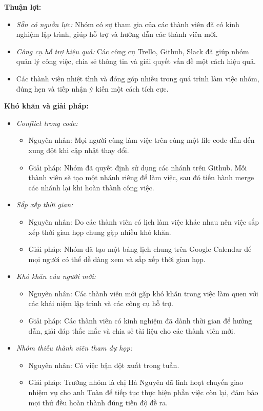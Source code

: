 \documentclass[a4paper,12pt]{article}
\begin{document}
\textbf{Thuận lợi:}
\begin{itemize}
    \item \textit{Sẵn có nguồn lực:} Nhóm có sự tham gia của các thành viên đã có kinh nghiệm lập trình, giúp hỗ trợ và hướng dẫn các thành viên mới.
    \item \textit{Công cụ hỗ trợ hiệu quả:} Các công cụ Trello, Github, Slack đã giúp nhóm quản lý công việc, chia sẻ thông tin và giải quyết vấn đề một cách hiệu quả.
    \item Các thành viên nhiệt tình và đóng góp nhiều trong quá trình làm việc nhóm, đúng hẹn và tiếp nhận ý kiến một cách tích cực.
\end{itemize}

\textbf{Khó khăn và giải pháp:}
\begin{itemize}
    \item \textit{Conflict trong code:}
    \begin{itemize}
        \item Nguyên nhân: Mọi người cùng làm việc trên cùng một file code dẫn đến xung đột khi cập nhật thay đổi.
        \item Giải pháp: Nhóm đã quyết định sử dụng các nhánh trên Github. Mỗi thành viên sẽ tạo một nhánh riêng để làm việc, sau đó tiến hành merge các nhánh lại khi hoàn thành công việc.
    \end{itemize}

    \item \textit{Sắp xếp thời gian:}
    \begin{itemize}
        \item Nguyên nhân: Do các thành viên có lịch làm việc khác nhau nên việc sắp xếp thời gian họp chung gặp nhiều khó khăn.
        \item Giải pháp: Nhóm đã tạo một bảng lịch chung trên Google Calendar để mọi người có thể dễ dàng xem và sắp xếp thời gian họp.
    \end{itemize}

    \item \textit{Khó khăn của người mới:}
    \begin{itemize}
        \item Nguyên nhân: Các thành viên mới gặp khó khăn trong việc làm quen với các khái niệm lập trình và các công cụ hỗ trợ.
        \item Giải pháp: Các thành viên có kinh nghiệm đã dành thời gian để hướng dẫn, giải đáp thắc mắc và chia sẻ tài liệu cho các thành viên mới.
    \end{itemize}

    \item \textit{Nhóm thiếu thành viên tham dự họp:}
    \begin{itemize}
        \item Nguyên nhân: Có việc bận đột xuất trong tuần.
        \item Giải pháp: Trưởng nhóm là chị Hà Nguyên đã linh hoạt chuyển giao nhiệm vụ cho anh Toàn để tiếp tục thực hiện phần việc còn lại, đảm bảo mọi thứ đều hoàn thành đúng tiến độ đề ra.
    \end{itemize}
\end{itemize}
\end{document}
